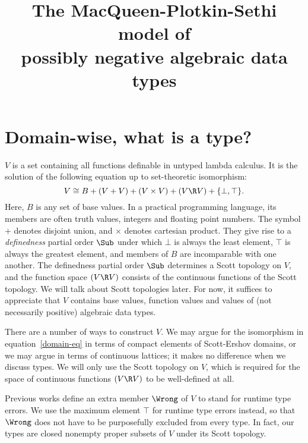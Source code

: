 \documentclass{amsart}
\title[The MPS model of possibly negative algebraic data types]
{The MacQueen-Plotkin-Sethi model of
\\
possibly negative algebraic data types}
\begin{document}
\maketitle

\section{Domain-wise, what is a type?}


$V$ is a set containing all functions definable in untyped lambda
calculus. It is the solution of the following equation up to
set-theoretic isomorphism:
\begin{equation}\label{domain-eq}
V \cong B + (V + V) + (V \times V) + (V \R V) + \{\bot, \top\}.
\end{equation}
Here, $B$ is any set of base values. In a practical programming
language, its members are often truth values, integers and
floating point numbers. The symbol $+$ denotes disjoint union,
and $\times$ denotes cartesian product. They give rise to a
\emph{definedness} partial order $\Sub$ under which $\bot$ is
always the least element, $\top$ is always the greatest element,
and members of $B$ are incomparable with one another. The
definedness partial order $\Sub$ determines a Scott topology on
$V$, and the function space $(V \R V)$ consists of the continuous
functions of the Scott topology. We will talk about Scott
topologies later. For now, it suffices to appreciate that $V$
contains base values, function values and values of (not
necessarily positive) algebraic data types.

There are a number of ways to construct $V$. We may argue for the
isomorphism in equation~\eqref{domain-eq} in terms of compact
elements of Scott-Ershov domains, or we may argue in terms of
continuous lattices; it makes no difference when we discuss
types. We will only use the Scott topology on $V$, which is
required for the space of continuous functions $(V\R V)$ to be
well-defined at all.

Previous works define an extra member $\Wrong$ of $V$ to stand
for runtime type errors. We use the maximum element $\top$ for
runtime type errors instead, so that $\Wrong$ does not have to be
purposefully excluded from every type. In fact, our types are
closed nonempty proper subsets of $V$ under its Scott topology.
\end{document}
